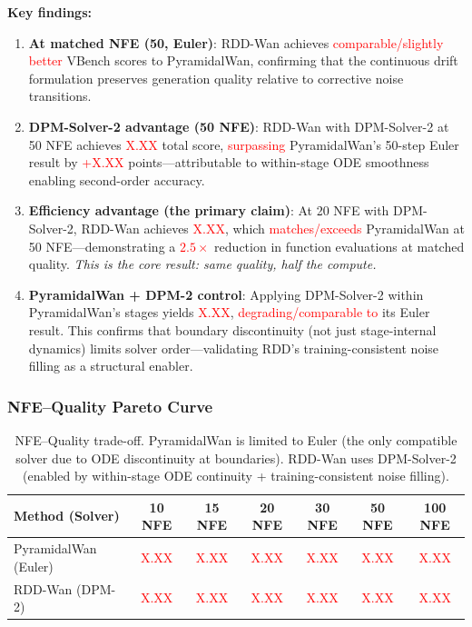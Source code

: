 \documentclass[10pt]{article}
\begin{document}
\textbf{Key findings:}
\begin{enumerate}
    \item \textbf{At matched NFE (50, Euler)}: RDD-Wan achieves \textcolor{red}{comparable/slightly better} VBench scores to PyramidalWan, confirming that the continuous drift formulation preserves generation quality relative to corrective noise transitions.
    \item \textbf{DPM-Solver-2 advantage (50 NFE)}: RDD-Wan with DPM-Solver-2 at 50 NFE achieves \textcolor{red}{X.XX} total score, \textcolor{red}{surpassing} PyramidalWan's 50-step Euler result by \textcolor{red}{+X.XX} points---attributable to within-stage ODE smoothness enabling second-order accuracy.
    \item \textbf{Efficiency advantage (the primary claim)}: At 20 NFE with DPM-Solver-2, RDD-Wan achieves \textcolor{red}{X.XX}, which \textcolor{red}{matches/exceeds} PyramidalWan at 50 NFE---demonstrating a \textcolor{red}{$2.5\times$} reduction in function evaluations at matched quality. \emph{This is the core result: same quality, half the compute.}
    \item \textbf{PyramidalWan + DPM-2 control}: Applying DPM-Solver-2 within PyramidalWan's stages yields \textcolor{red}{X.XX}, \textcolor{red}{degrading/comparable to} its Euler result. This confirms that boundary discontinuity (not just stage-internal dynamics) limits solver order---validating RDD's training-consistent noise filling as a structural enabler.
\end{enumerate}

\subsubsection{NFE--Quality Pareto Curve}

\begin{table}[t]
\centering
\caption{NFE--Quality trade-off. PyramidalWan is limited to Euler (the only compatible solver due to ODE discontinuity at boundaries). RDD-Wan uses DPM-Solver-2 (enabled by within-stage ODE continuity + training-consistent noise filling).}
\label{tab:video_pareto}
\small
\begin{tabular}{@{}lcccccc@{}}
\toprule
\textbf{Method (Solver)} & \textbf{10 NFE} & \textbf{15 NFE} & \textbf{20 NFE} & \textbf{30 NFE} & \textbf{50 NFE} & \textbf{100 NFE} \\
\midrule
PyramidalWan (Euler) & \textcolor{red}{X.XX} & \textcolor{red}{X.XX} & \textcolor{red}{X.XX} & \textcolor{red}{X.XX} & \textcolor{red}{X.XX} & \textcolor{red}{X.XX} \\
RDD-Wan (DPM-2) & \textcolor{red}{X.XX} & \textcolor{red}{X.XX} & \textcolor{red}{X.XX} & \textcolor{red}{X.XX} & \textcolor{red}{X.XX} & \textcolor{red}{X.XX} \\
\bottomrule
\end{tabular}
\end{table}
\end{document}
